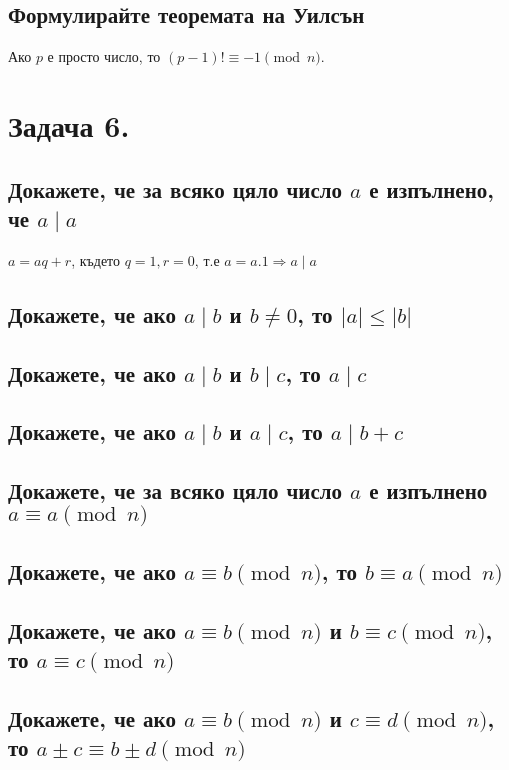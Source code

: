\documentclass[12pt]{article}
\begin{document}
\subsection*{Формулирайте теоремата на Уилсън}
Ако $p$ е просто число, то $(p - 1)! \equiv -1 \pmod{n}.$

\section*{Задача 6.}

\subsection*{Докажете, че за всяко цяло число $a$ е изпълнено, че $a \mid a$}
$a = aq + r$, където $q = 1, r = 0$, т.е $a = a.1 \Rightarrow a \mid a$

\subsection*{Докажете, че ако $a \mid b$ и $b \neq 0$, то $|a| \leq |b|$}


\subsection*{Докажете, че ако $a \mid b$ и $b \mid c$, то $a \mid c$}
\subsection*{Докажете, че ако $a \mid b$ и $a \mid c$, то $a \mid b + c$}
\subsection*{Докажете, че за всяко цяло число $a$ е изпълнено $a \equiv a \pmod{n}$}
\subsection*{Докажете, че ако $a \equiv b \pmod{n}$, то $b \equiv a \pmod{n}$} 
\subsection*{Докажете, че ако $a \equiv b \pmod{n}$ и $b \equiv c \pmod{n}$, то $a \equiv c \pmod{n}$}
\subsection*{Докажете, че ако $a \equiv b \pmod{n}$ и $c \equiv d \pmod{n}$, то $a \pm c \equiv b \pm d \pmod{n}$}
\end{document}
